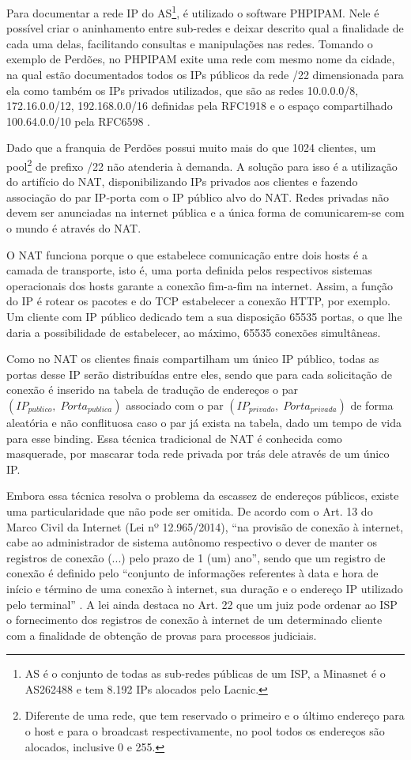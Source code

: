    Para documentar a rede IP do AS\footnote{AS é o conjunto de todas as sub-redes públicas de um ISP, a Minasnet é o AS262488 e tem 8.192 IPs alocados pelo Lacnic.}, é utilizado o software PHPIPAM. Nele é possível criar o aninhamento entre sub-redes e deixar descrito qual a finalidade de cada uma delas, facilitando consultas e manipulações nas redes. Tomando o exemplo de Perdões, no PHPIPAM exite uma rede com mesmo nome da cidade, na qual estão documentados todos os IPs públicos da rede /22 dimensionada para ela como também os IPs privados utilizados, que são as redes 10.0.0.0/8, 172.16.0.0/12, 192.168.0.0/16 definidas pela RFC1918 \cite{rfc1918} e o espaço compartilhado 100.64.0.0/10 pela RFC6598 \cite{rfc6598}.
   
   Dado que a franquia de Perdões possui muito mais do que 1024 clientes, um pool\footnote{Diferente de uma rede, que tem reservado o primeiro e o último endereço para o host e para o broadcast respectivamente, no pool todos os endereços são alocados, inclusive 0 e 255.} de prefixo /22 não atenderia à demanda. A solução para isso é a utilização do artifício do NAT, disponibilizando IPs privados aos clientes e fazendo associação do par IP-porta com o IP público alvo do NAT. Redes privadas não devem ser anunciadas na internet pública e a única forma de comunicarem-se com o mundo é através do NAT. 
   
   O NAT funciona porque o que estabelece comunicação entre dois hosts é a camada de transporte, isto é, uma porta definida pelos respectivos sistemas operacionais dos hosts garante a conexão fim-a-fim na internet. Assim, a função do IP é rotear os pacotes e do TCP estabelecer a conexão HTTP, por exemplo. Um cliente com IP público dedicado tem a sua disposição 65535 portas, o que lhe daria a possibilidade de estabelecer, ao máximo, 65535 conexões simultâneas.
   
   Como no NAT os clientes finais compartilham um único IP público, todas as portas desse IP serão distribuídas entre eles, sendo que para cada solicitação de conexão é inserido na tabela de tradução de endereços o par $ ( IP_{publico}, \; Porta_{publica} ) $ associado com o par $ ( IP_{privado}, \; Porta_{privada} ) $ de forma aleatória e não conflituosa caso o par já exista na tabela, dado um tempo de vida para esse binding. Essa técnica tradicional de NAT é conhecida como masquerade, por mascarar toda rede privada por trás dele através de um único IP.
   
   Embora essa técnica resolva o problema da escassez de endereços públicos, existe uma particularidade que não pode ser omitida. De acordo com o Art. 13 do Marco Civil da Internet (Lei nº 12.965/2014), ``na provisão de conexão à internet, cabe ao administrador de sistema autônomo respectivo o dever de manter os registros de conexão (...) pelo prazo de 1 (um) ano'', sendo que um registro de conexão é definido pelo ``conjunto de informações referentes à data e hora de início e término de uma conexão à internet, sua duração e o endereço IP utilizado pelo terminal'' \cite{lei12965}. A lei ainda destaca no Art. 22 que um juiz pode ordenar ao ISP o fornecimento dos registros de conexão à internet de um determinado cliente com a finalidade de obtenção de provas para processos judiciais.
   
